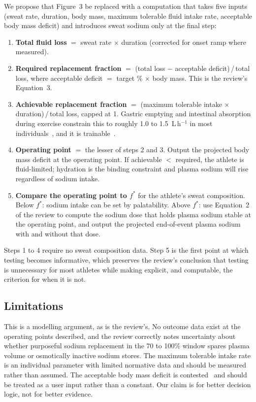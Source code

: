 \documentclass[11pt,a4paper]{article}
\newcommand{\Lh}{L\,h$^{-1}$}
\newcommand{\fstar}{f^{*}}
\begin{document}
We propose that Figure~3 be replaced with a computation that takes five inputs (sweat rate, duration, body mass, maximum tolerable fluid intake rate, acceptable body mass deficit) and introduces sweat sodium only at the final step:
\begin{enumerate}[nosep]
  \item \textbf{Total fluid loss} $=$ sweat rate $\times$ duration (corrected for onset ramp where measured).
  \item \textbf{Required replacement fraction} $=$ (total loss $-$ acceptable deficit)\,/\,total loss, where acceptable deficit $=$ target \% $\times$ body mass. This is the review's Equation~3.
  \item \textbf{Achievable replacement fraction} $=$ (maximum tolerable intake $\times$ duration)\,/\,total loss, capped at 1. Gastric emptying and intestinal absorption during exercise constrain this to roughly 1.0 to 1.5~\Lh{} in most individuals~\cite{leiper2015}, and it is trainable~\cite{jeukendrup2017}.
  \item \textbf{Operating point} $=$ the lesser of steps 2 and 3. Output the projected body mass deficit at the operating point. If achievable $<$ required, the athlete is fluid-limited; hydration is the binding constraint and plasma sodium will rise regardless of sodium intake.
  \item \textbf{Compare the operating point to $\fstar$} for the athlete's sweat composition. Below $\fstar$: sodium intake can be set by palatability. Above $\fstar$: use Equation~2 of the review to compute the sodium dose that holds plasma sodium stable at the operating point, and output the projected end-of-event plasma sodium with and without that dose.
\end{enumerate}
Steps 1 to 4 require no sweat composition data. Step 5 is the first point at which testing becomes informative, which preserves the review's conclusion that testing is unnecessary for most athletes while making explicit, and computable, the criterion for when it is not.

\subsection*{Limitations}

This is a modelling argument, as is the review's. No outcome data exist at the operating points described, and the review correctly notes uncertainty about whether purposeful sodium replacement in the 70 to 100\% window spares plasma volume or osmotically inactive sodium stores. The maximum tolerable intake rate is an individual parameter with limited normative data and should be measured rather than assumed. The acceptable body mass deficit is contested~\cite{james2019} and should be treated as a user input rather than a constant. Our claim is for better decision logic, not for better evidence.
\end{document}

